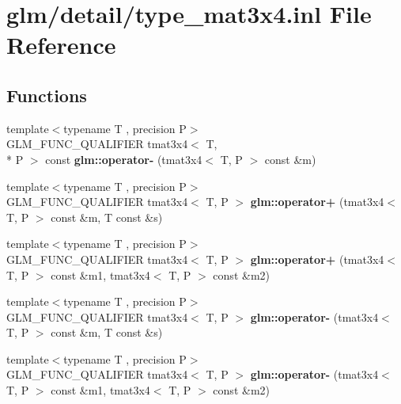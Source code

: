 \hypertarget{type__mat3x4_8inl}{\section{glm/detail/type\-\_\-mat3x4.inl File Reference}
\label{type__mat3x4_8inl}
}
\subsection*{Functions}
\begin{DoxyCompactItemize}
\item 
\hypertarget{namespaceglm_a387dd4398c5763606a656123d3782cb8}{{\footnotesize template$<$typename T , precision P$>$ }\\G\-L\-M\-\_\-\-F\-U\-N\-C\-\_\-\-Q\-U\-A\-L\-I\-F\-I\-E\-R tmat3x4$<$ T, \\*
P $>$ const {\bfseries glm\-::operator-\/} (tmat3x4$<$ T, P $>$ const \&m)}\label{namespaceglm_a387dd4398c5763606a656123d3782cb8}

\item 
\hypertarget{namespaceglm_a6922ab94873919fd84bc2c3bdfa07161}{{\footnotesize template$<$typename T , precision P$>$ }\\G\-L\-M\-\_\-\-F\-U\-N\-C\-\_\-\-Q\-U\-A\-L\-I\-F\-I\-E\-R tmat3x4$<$ T, P $>$ {\bfseries glm\-::operator+} (tmat3x4$<$ T, P $>$ const \&m, T const \&s)}\label{namespaceglm_a6922ab94873919fd84bc2c3bdfa07161}

\item 
\hypertarget{namespaceglm_a561a98c191b0a0dd371b7a076cda269d}{{\footnotesize template$<$typename T , precision P$>$ }\\G\-L\-M\-\_\-\-F\-U\-N\-C\-\_\-\-Q\-U\-A\-L\-I\-F\-I\-E\-R tmat3x4$<$ T, P $>$ {\bfseries glm\-::operator+} (tmat3x4$<$ T, P $>$ const \&m1, tmat3x4$<$ T, P $>$ const \&m2)}\label{namespaceglm_a561a98c191b0a0dd371b7a076cda269d}

\item 
\hypertarget{namespaceglm_acdaa9aa6b7961c7473df41fcc89eedeb}{{\footnotesize template$<$typename T , precision P$>$ }\\G\-L\-M\-\_\-\-F\-U\-N\-C\-\_\-\-Q\-U\-A\-L\-I\-F\-I\-E\-R tmat3x4$<$ T, P $>$ {\bfseries glm\-::operator-\/} (tmat3x4$<$ T, P $>$ const \&m, T const \&s)}\label{namespaceglm_acdaa9aa6b7961c7473df41fcc89eedeb}

\item 
\hypertarget{namespaceglm_a6349098541c329f41e900eaf05eca9f7}{{\footnotesize template$<$typename T , precision P$>$ }\\G\-L\-M\-\_\-\-F\-U\-N\-C\-\_\-\-Q\-U\-A\-L\-I\-F\-I\-E\-R tmat3x4$<$ T, P $>$ {\bfseries glm\-::operator-\/} (tmat3x4$<$ T, P $>$ const \&m1, tmat3x4$<$ T, P $>$ const \&m2)}\label{namespaceglm_a6349098541c329f41e900eaf05eca9f7}


\end{DoxyCompactItemize}
